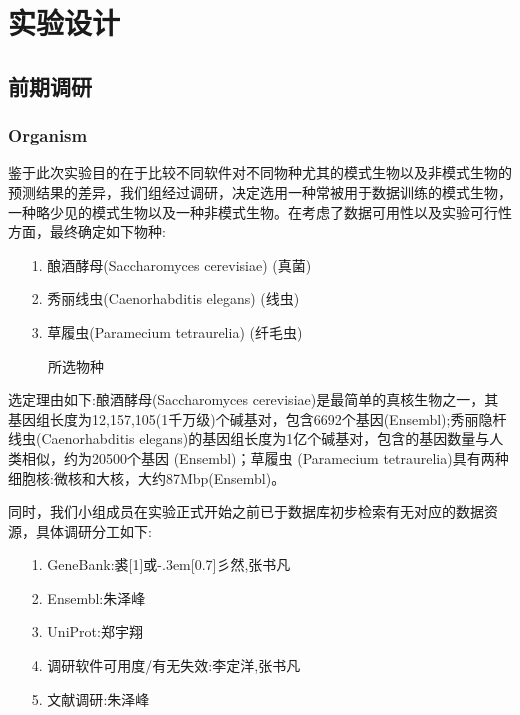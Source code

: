 \documentclass[12pt]{ctexart}
\newcommand{\yu}{\hbox{\scalebox{1}[1]{或}\kern-.3em\scalebox{0.3}[0.7]{彡}}}
\begin{document}
\newpage

\tableofcontents 

\newpage

\section{实验设计}

\subsection{前期调研}

\subsubsection{Organism}

鉴于此次实验目的在于比较不同软件对不同物种尤其的模式生物以及非模式生物的预测结果的差异，我们组经过调研，决定选用一种常被用于数据训练的模式生物，一种略少见的模式生物以及一种非模式生物。在考虑了数据可用性以及实验可行性方面，最终确定如下物种:

\begin{itemize}
    \item [1.] 酿酒酵母(Saccharomyces cerevisiae) (真菌)
    \item [2.] 秀丽线虫(Caenorhabditis elegans) (线虫)
    \item [3.] 草履虫(Paramecium tetraurelia) (纤毛虫)
\end{itemize}

\begin{figure}[htbp]
\centering
{}
\quad
{}
\quad
{}
\caption{ 所选物种}
\end{figure}

选定理由如下:酿酒酵母(Saccharomyces cerevisiae)是最简单的真核生物之一，其基因组长度为12,157,105(1千万级)个碱基对，包含6692个基因(Ensembl);秀丽隐杆线虫(Caenorhabditis elegans)的基因组长度为1亿个碱基对，包含的基因数量与人类相似，约为20500个基因 (Ensembl)；草履虫 (Paramecium tetraurelia)具有两种细胞核:微核和大核，大约87Mbp(Ensembl)。

同时，我们小组成员在实验正式开始之前已于数据库初步检索有无对应的数据资源，具体调研分工如下:

\begin{itemize}
    \item [1.] GeneBank:裘\yu 然,张书凡
    \item [2.] Ensembl:朱泽峰
    \item [3.] UniProt:郑宇翔
    \item [4.] 调研软件可用度/有无失效:李定洋,张书凡
    \item [5.] 文献调研\citep{10.1016/j.csbj.2016.07.002}:朱泽峰
\end{itemize}
\end{document}
